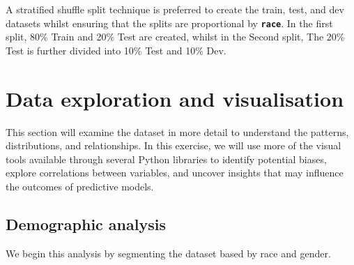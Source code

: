 \documentclass[conference]{IEEEtran}
\begin{document}
	A stratified shuffle split technique is preferred to create the train, test, and dev datasets whilst ensuring that the splits are proportional by \textbf{\texttt{race}}. In the first split, 80\% Train and 20\% Test are created, whilst in the Second split, The 20\% Test is further divided into 10\% Test and 10\% Dev.


	\section{Data exploration and visualisation}
	
	This section will examine the dataset in more detail to understand the patterns, distributions, and relationships. In this exercise, we will use more of the visual tools available through several Python libraries to identify potential biases, explore correlations between variables, and uncover insights that may influence the outcomes of predictive models. 
	
	\subsection {Demographic analysis}
	
	We begin this analysis by segmenting the dataset based by race and gender.
	
\end{document}
